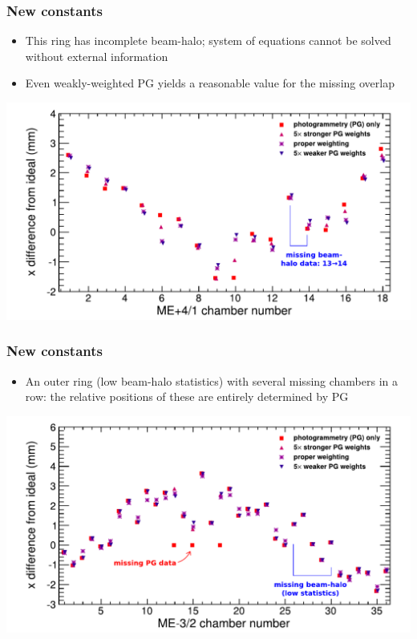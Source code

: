 \documentclass[compress]{beamer}
\begin{document}
\begin{frame}
\frametitle{New constants}

\begin{itemize}
\item This ring has incomplete beam-halo; system of equations cannot
  be solved without external information
\item Even weakly-weighted PG yields a reasonable value for the
  missing overlap
\end{itemize}

\includegraphics[width=\linewidth]{dependence_on_weights_p41.pdf}
\end{frame}

\begin{frame}
\frametitle{New constants}

\begin{itemize}
\item An outer ring (low beam-halo statistics) with several missing
  chambers in a row: the relative positions of these are entirely
  determined by PG
\end{itemize}

\includegraphics[width=\linewidth]{dependence_on_weights_32.pdf}
\end{frame}
\end{document}
